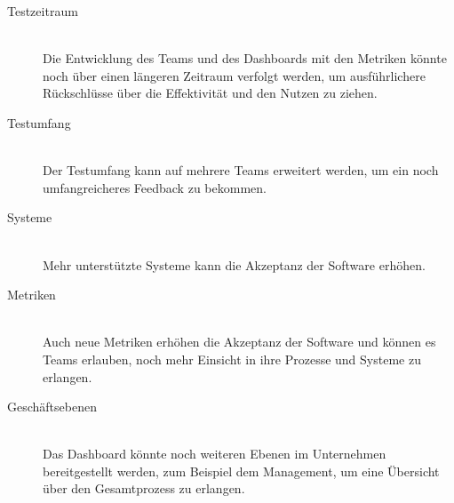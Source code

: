 \begin{description}
    \item[Testzeitraum] \hfill \\ Die Entwicklung des Teams und des Dashboards mit den Metriken könnte noch über einen längeren Zeitraum verfolgt werden, um ausführlichere Rückschlüsse über die Effektivität und den Nutzen zu ziehen.
    \item[Testumfang] \hfill \\ Der Testumfang kann auf mehrere Teams erweitert werden, um ein noch umfangreicheres Feedback zu bekommen.
    \item[Systeme] \hfill \\ Mehr unterstützte Systeme kann die Akzeptanz der Software erhöhen.
    \item[Metriken] \hfill \\ Auch neue Metriken erhöhen die Akzeptanz der Software und können es Teams erlauben, noch mehr Einsicht in ihre Prozesse und Systeme zu erlangen.
    \item[Geschäftsebenen] \hfill \\ Das Dashboard könnte noch weiteren Ebenen im Unternehmen bereitgestellt werden, zum Beispiel dem Management, um eine Übersicht über den Gesamtprozess zu erlangen.
\end{description}
